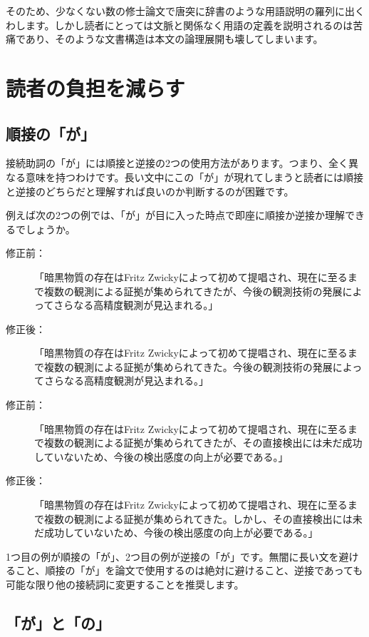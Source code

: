 そのため、少なくない数の修士論文で唐突に辞書のような用語説明の羅列に出くわします。しかし読者にとっては文脈と関係なく用語の定義を説明されるのは苦痛であり、そのような文書構造は本文の論理展開も壊してしまいます。

\section{読者の負担を減らす}

\subsection{順接の「が」}

接続助詞の「が」には順接と逆接の2つの使用方法があります。つまり、全く異なる意味を持つわけです。長い文中にこの「が」が現れてしまうと読者には順接と逆接のどちらだと理解すれば良いのか判断するのが困難です。

例えば次の2つの例では、「が」が目に入った時点で即座に順接か逆接か理解できるでしょうか。

\begin{description}
\item[修正前：]「暗黒物質の存在はFritz Zwickyによって初めて提唱され、現在に至るまで複数の観測による証拠が集められてきたが、今後の観測技術の発展によってさらなる高精度観測が見込まれる。」
\item[修正後：]「暗黒物質の存在はFritz Zwickyによって初めて提唱され、現在に至るまで複数の観測による証拠が集められてきた。今後の観測技術の発展によってさらなる高精度観測が見込まれる。」
\end{description}

\begin{description}
\item[修正前：]「暗黒物質の存在はFritz Zwickyによって初めて提唱され、現在に至るまで複数の観測による証拠が集められてきたが、その直接検出には未だ成功していないため、今後の検出感度の向上が必要である。」
\item[修正後：]「暗黒物質の存在はFritz Zwickyによって初めて提唱され、現在に至るまで複数の観測による証拠が集められてきた。しかし、その直接検出には未だ成功していないため、今後の検出感度の向上が必要である。」
\end{description}

1つ目の例が順接の「が」、2つ目の例が逆接の「が」です。無闇に長い文を避けること、順接の「が」を論文で使用するのは絶対に避けること、逆接であっても可能な限り他の接続詞に変更することを推奨します。

\subsection{「が」と「の」}

